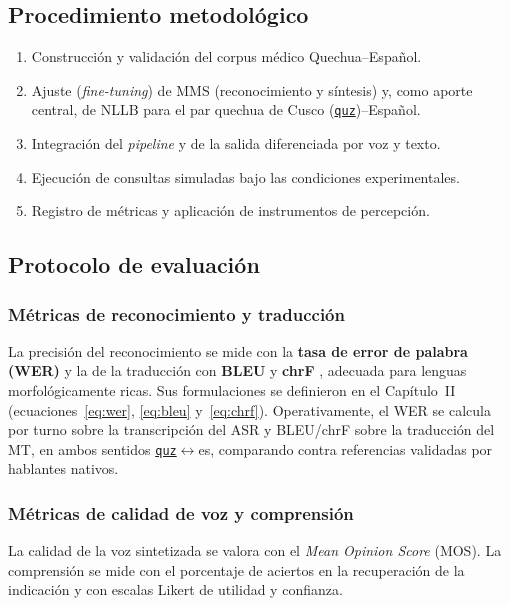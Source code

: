 \documentclass[12pt,a4paper]{article}
\newcommand{\nuevo}[1]{#1}
\DeclareRobustCommand{\sig}[1]{\hyperlink{sig:#1}{\texttt{#1}}}
\begin{document}
\subsection{Procedimiento metodol{\'o}gico}
\begin{enumerate}
  \item Construcci{\'o}n y validaci{\'o}n del corpus m{\'e}dico Quechua--Espa{\~n}ol.
  \item Ajuste (\emph{fine-tuning}) de MMS (reconocimiento y s{\'i}ntesis) y, como aporte central, de NLLB para el par quechua de Cusco (\sig{quz})--Espa{\~n}ol.
  \item Integraci{\'o}n del \emph{pipeline} y de la salida diferenciada por voz y texto.
  \item Ejecuci{\'o}n de consultas simuladas bajo las condiciones experimentales.
  \item Registro de m{\'e}tricas y aplicaci{\'o}n de instrumentos de percepci{\'o}n.
\end{enumerate}

\subsection{Protocolo de evaluaci{\'o}n}

\subsubsection{M{\'e}tricas de reconocimiento y traducci{\'o}n}
La precisi{\'o}n del reconocimiento se mide con la \textbf{tasa de error de palabra (WER)} y la de la
traducci{\'o}n con \textbf{BLEU} \parencite{papineni2002bleu} y \textbf{chrF} \parencite{popovic2015chrf},
adecuada para lenguas morfol{\'o}gicamente ricas. \nuevo{Sus formulaciones se definieron en el
Cap{\'i}tulo~II (ecuaciones~\ref{eq:wer}, \ref{eq:bleu} y~\ref{eq:chrf}).} Operativamente, el WER se
calcula por turno sobre la transcripci{\'o}n del ASR y BLEU/chrF sobre la traducci{\'o}n del MT, en
ambos sentidos \sig{quz}$\leftrightarrow$es, comparando contra referencias validadas por hablantes
nativos.

\subsubsection{M{\'e}tricas de calidad de voz y comprensi{\'o}n}
La calidad de la voz sintetizada se valora con el \emph{Mean Opinion Score} (MOS). La comprensi{\'o}n
se mide con el porcentaje de aciertos en la recuperaci{\'o}n de la indicaci{\'o}n y con escalas Likert
de utilidad y confianza.
\end{document}
